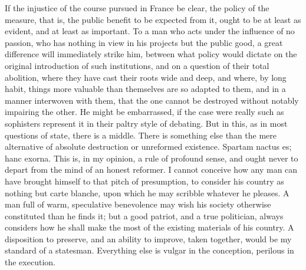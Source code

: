 If the injustice of the course pursued in France be clear, the policy of the measure, that is, the public benefit to be expected from it, ought to be at least as evident, and at least as important. To a man who acts under the influence of no passion, who has nothing in view in his projects but the public good, a great difference will immediately strike him, between what policy would dictate on the original introduction of such institutions, and on a question of their total abolition, where they have cast their roots wide and deep, and where, by long habit, things more valuable than themselves are so adapted to them, and in a manner interwoven with them, that the one cannot be destroyed without notably impairing the other. He might be embarrassed, if the case were really such as sophisters represent it in their paltry style of debating. But in this, as in most questions of state, there is a middle. There is something else than the mere alternative of absolute destruction or unreformed existence. Spartam nactus es; hanc exorna. This is, in my opinion, a rule of profound sense, and ought never to depart from the mind of an honest reformer. I cannot conceive how any man can have brought himself to that pitch of presumption, to consider his country as nothing but carte blanche, upon which he may scribble whatever he pleases. A man full of warm, speculative benevolence may wish his society otherwise constituted than he finds it; but a good patriot, and a true politician, always considers how he shall make the most of the existing materials of his country. A disposition to preserve, and an ability to improve, taken together, would be my standard of a statesman. Everything else is vulgar in the conception, perilous in the execution.

